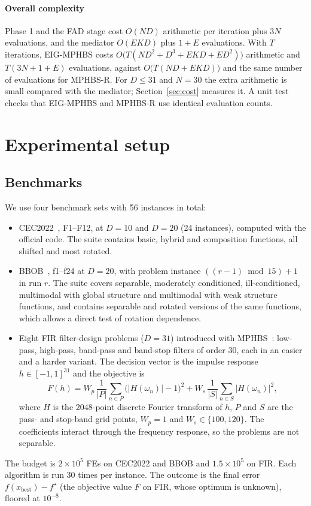 \documentclass[preprint,12pt,authoryear]{elsarticle}
\theoremstyle{remark}
\begin{document}
\paragraph{Overall complexity} Phase 1 and the FAD stage cost $O(ND)$ arithmetic per iteration plus $3N$ evaluations,
and the mediator $O(EKD)$ plus $1+E$ evaluations. With $T$ iterations, EIG-MPHBS costs
$O\bigl(T(ND^2+D^3+EKD+ED^2)\bigr)$ arithmetic and $T(3N+1+E)$ evaluations, against $O\bigl(T(ND+EKD)\bigr)$ and the same
number of evaluations for MPHBS-R. For $D\le 31$ and $N=30$ the extra arithmetic is small compared with the mediator;
Section~\ref{sec:cost} measures it. A unit test checks that EIG-MPHBS and MPHBS-R use identical evaluation counts.

\section{Experimental setup}
\label{sec:setup}

\subsection{Benchmarks}
We use four benchmark sets with 56 instances in total:
\begin{itemize}
\item CEC2022~\citep{kumar2021cec2022}, F1--F12, at $D=10$ and $D=20$ (24 instances), computed with the official code.
The suite contains basic, hybrid and composition functions, all shifted and most rotated.
\item BBOB~\citep{hansen2009bbob}, f1--f24 at $D=20$, with problem instance $((r-1)\bmod 15)+1$ in run $r$. The suite
covers separable, moderately conditioned, ill-conditioned, multimodal with global structure and multimodal with weak
structure functions, and contains separable and rotated versions of the same functions, which allows a direct test of
rotation dependence.
\item Eight FIR filter-design problems ($D=31$) introduced with MPHBS~\citep{flores2026mphbs}: low-pass, high-pass,
band-pass and band-stop filters of order 30, each in an easier and a harder variant. The decision vector is the impulse
response $h\in[-1,1]^{31}$ and the objective is
\begin{equation}
F(h) = W_p\,\frac{1}{|P|}\sum_{n\in P}\bigl(|H(\omega_n)|-1\bigr)^2 + W_s\,\frac{1}{|S|}\sum_{n\in S}|H(\omega_n)|^2,
\label{eq:fir}
\end{equation}
where $H$ is the 2048-point discrete Fourier transform of $h$, $P$ and $S$ are the pass- and stop-band grid points,
$W_p=1$ and $W_s\in\{100,120\}$. The coefficients interact through the frequency response, so the problems are not
separable.
\end{itemize}
The budget is $2\times10^5$ FEs on CEC2022 and BBOB and $1.5\times10^5$ on FIR. Each algorithm is run 30 times per
instance. The outcome is the final error $f(x_\mathrm{best})-f^\star$ (the objective value $F$ on FIR, whose optimum is
unknown), floored at $10^{-8}$.
\end{document}
